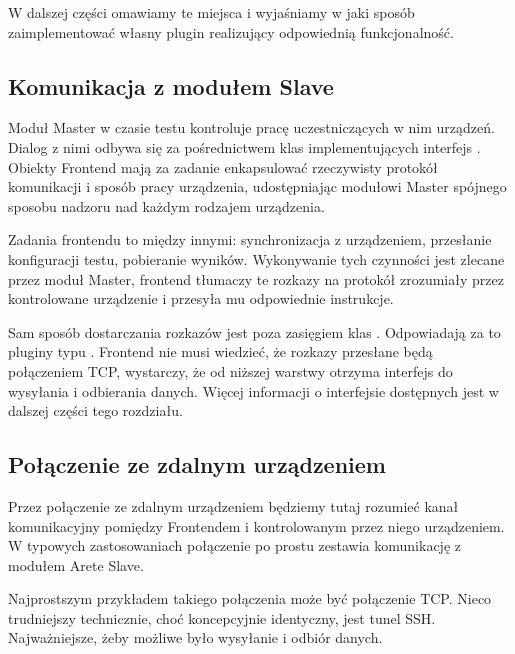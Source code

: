 \documentclass[00-praca-magisterska.tex]{subfiles}
\begin{document}
W dalszej części omawiamy te miejsca i wyjaśniamy w jaki sposób zaimplementować
własny plugin realizujący odpowiednią funkcjonalność.

\subsection{Komunikacja z modułem Slave}

Moduł Master w czasie testu kontroluje pracę uczestniczących w nim urządzeń.
Dialog z nimi odbywa się za pośrednictwem klas implementujących interfejs
. Obiekty Frontend mają za zadanie enkapsulować rzeczywisty
protokół komunikacji i sposób pracy urządzenia, udostępniając modułowi Master
spójnego sposobu nadzoru nad każdym rodzajem urządzenia.

Zadania frontendu to między innymi: synchronizacja z urządzeniem, przesłanie
konfiguracji testu, pobieranie wyników. Wykonywanie tych czynności jest zlecane
przez moduł Master, frontend tłumaczy te rozkazy na protokół zrozumiały przez
kontrolowane urządzenie i przesyła mu odpowiednie instrukcje.

Sam sposób dostarczania rozkazów jest poza zasięgiem klas .
Odpowiadają za to pluginy typu . Frontend nie musi
wiedzieć, że rozkazy przesłane będą połączeniem TCP, wystarczy, że od niższej
warstwy otrzyma interfejs do wysyłania i odbierania danych. Więcej informacji o
interfejsie  dostępnych jest w dalszej części tego
rozdziału.


\subsection{Połączenie ze zdalnym urządzeniem}

Przez połączenie ze zdalnym urządzeniem będziemy tutaj rozumieć kanał
komunikacyjny pomiędzy Frontendem i kontrolowanym przez niego urządzeniem. W
typowych zastosowaniach połączenie po prostu zestawia komunikację z modułem
Arete Slave.  

Najprostszym przykładem takiego połączenia może być połączenie TCP. Nieco
trudniejszy technicznie, choć koncepcyjnie identyczny, jest tunel SSH.
Najważniejsze, żeby możliwe było wysyłanie i odbiór danych.
\end{document}
